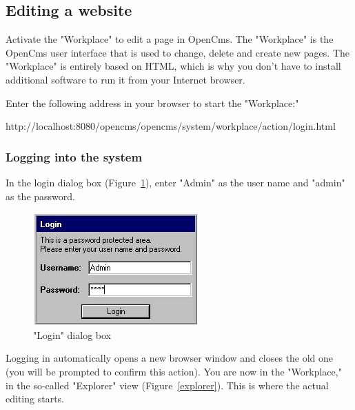 \subsection{Editing a website}

Activate the "Workplace" to edit a page in OpenCms. The
"Workplace" is the OpenCms user interface that is used to change,
delete and create new pages. The "Workplace" is entirely based on
HTML, which is why you don't have to install additional software
to run it from your Internet browser.

Enter the following address in your browser to start the
"Workplace:"

http://localhost:8080/opencms/opencms/system/workplace/action/login.html

\subsubsection{Logging into the system}

In the login dialog box (Figure~\ref{loginbox}), enter "Admin" as
the user name and "admin" as the password.

\begin{figure}[hbt]
\begin{minipage}[b]{0.499\linewidth}
   \begin{center}
\includegraphics[width=\sgw]
                   {pics/usermanual/loginBox}
\caption["Login" dialog box]
           {"Login" dialog box}
\label{loginbox}
   \end{center}
\end{minipage}
\hfill
\end{figure}

Logging in automatically opens a new browser window and closes the
old one (you will be prompted to confirm this action). You are now
in the "Workplace," in the so-called "Explorer" view
(Figure~\ref{explorer}). This is where the actual editing starts.

